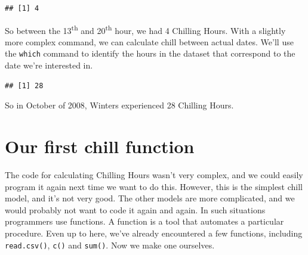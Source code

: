 \documentclass[
]{book}
\newenvironment{Shaded}{\begin{snugshade}}{\end{snugshade}}
\newcommand{\DecValTok}[1]{\textcolor[rgb]{0.00,0.00,0.81}{#1}}
\newcommand{\KeywordTok}[1]{\textcolor[rgb]{0.13,0.29,0.53}{\textbf{#1}}}
\newcommand{\NormalTok}[1]{#1}
\newcommand{\OperatorTok}[1]{\textcolor[rgb]{0.81,0.36,0.00}{\textbf{#1}}}
\newcommand{\StringTok}[1]{\textcolor[rgb]{0.31,0.60,0.02}{#1}}
\begin{document}
\begin{verbatim}
## [1] 4
\end{verbatim}

So between the 13\textsuperscript{th} and 20\textsuperscript{th} hour, we had 4 Chilling Hours. With a slightly more complex command, we can calculate chill between actual dates. We'll use the \texttt{which} command to identify the hours in the dataset that correspond to the date we're interested in.

\begin{Shaded}
\end{Shaded}

\begin{verbatim}
## [1] 28
\end{verbatim}

So in October of 2008, Winters experienced 28 Chilling Hours.

\hypertarget{our-first-chill-function}{%
\section{Our first chill function}\label{our-first-chill-function}}

The code for calculating Chilling Hours wasn't very complex, and we could easily program it again next time we want to do this. However, this is the simplest chill model, and it's not very good. The other models are more complicated, and we would probably not want to code it again and again. In such situations programmers use functions. A function is a tool that automates a particular procedure. Even up to here, we've already encountered a few functions, including \texttt{read.csv()}, \texttt{c()} and \texttt{sum()}. Now we make one ourselves.
\end{document}

